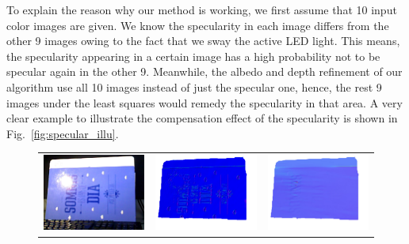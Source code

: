 To explain the reason why our method is working, we first assume that 10 input color images are given.
We know the specularity in each image differs from the other 9 images owing to the fact that we sway the active LED light.
This means, the specularity appearing in a certain image has a high probability not to be specular again in the other 9.
Meanwhile, the albedo and depth refinement of our algorithm use all 10 images instead of just the specular one,
hence, the rest 9 images under the least squares would remedy the specularity in that area.
A very clear example to illustrate the compensation effect of the specularity is shown in Fig.~\ref{fig:specular_illu}.
\begin{figure}[!ht]
\centering
\setlength{\tabcolsep}{0.1em} %
 {\renewcommand{\arraystretch}{1.6}%
\begin{tabular}{c|c c}
   \includegraphics[height = 0.24\linewidth]{figures/result/robust_folder_rgb.pdf} 
   &
   \includegraphics[height = 0.24\linewidth]{figures/result/rgbd_folder_normal.pdf} &
   \includegraphics[height = 0.24\linewidth]{figures/result/robust_folder_normal.pdf} \\


\end{tabular}}
\end{figure}

